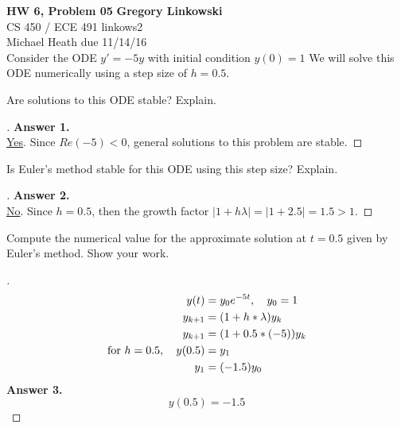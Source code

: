 \documentclass[12pt]{article}
\newenvironment{exercise}[2][Exercise]{\begin{trivlist}
\item[\hskip \labelsep {\bfseries #1}\hskip \labelsep {\bfseries #2.}]}{\end{trivlist}}
\begin{document}
\noindent
\large\textbf{HW 6, Problem 05} \hfill \textbf{Gregory Linkowski} \\
\normalsize CS 450 / ECE 491 \hfill linkows2 \\
Michael Heath \hfill due 11/14/16 \\


\vspace{5mm}
Consider the ODE $y′=−5y$ with initial condition $y(0)=1$ We will solve this ODE numerically using a step size of $h=0.5$.
\vspace{-2mm} \\

\begin{exercise}{1}
	Are solutions to this ODE stable? Explain.
\end{exercise} %
\begin{proof}[] \vspace{-2mm}
	\textbf{Answer 1.} \\ %
	\underline{Yes}. Since $Re(-5) < 0$, general solutions to this problem are stable.
\end{proof}

\vspace{2mm}
\begin{exercise}{2}
	Is Euler's method stable for this ODE using this step size? Explain.
\end{exercise} 
\begin{proof}[] \vspace{-2mm}
	\textbf{Answer 2.} \\ %
	\underline{No}. Since $h=0.5$, then the growth factor $|1 + h \lambda | = |1 + 2.5| = 1.5 > 1$. 
\end{proof}

\vspace{2mm}
\begin{exercise}{3}
	Compute the numerical value for the approximate solution at $t=0.5$ given by Euler's method. Show your work.
\end{exercise} 
\begin{proof}[] \vspace{-2mm}
	\begin{align*}
		y(t) &= y_0 e^{-5t}, \quad y_0 = 1 \\
		y_{k+1} &= (1 + h * \lambda) y_k \\
		y_{k+1} &= (1 + 0.5 * (-5)) y_k \\
		\textnormal{for } h = 0.5, \quad y(0.5) &= y_1 \\
		y_1 &= (-1.5) y_0
	\end{align*}
	\textbf{Answer 3.}  \vspace{-7mm} \\
	\[ \boxed{ y(0.5) = -1.5 } \]
\end{proof}
\end{document}
